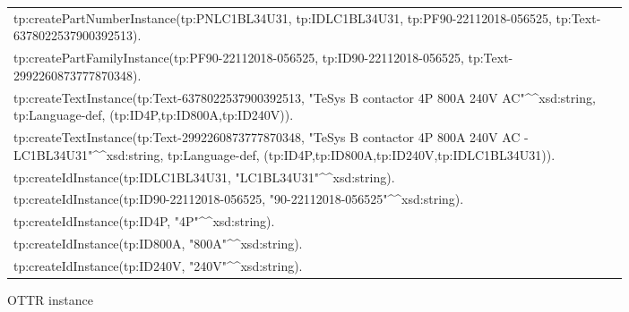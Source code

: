 \begin{figure}[H]
\ContinuedFloat

\begin{subfigure}{\textwidth}
  \centering

  \begin{table}[H]
	  \begin{tabular}{|p{0.98\linewidth}|}
		  \hline
		  tp:createPartNumberInstance(tp:PNLC1BL34U31, tp:IDLC1BL34U31, tp:PF90-22112018-056525, tp:Text-6378022537900392513). \\
		  tp:createPartFamilyInstance(tp:PF90-22112018-056525, tp:ID90-22112018-056525, tp:Text-2992260873777870348). \\
		  tp:createTextInstance(tp:Text-6378022537900392513, "TeSys B contactor 4P 800A 240V AC"\^{}\^{}xsd:string, tp:Language-def, (tp:ID4P,tp:ID800A,tp:ID240V)). \\
		  tp:createTextInstance(tp:Text-2992260873777870348, "TeSys B contactor 4P 800A 240V AC - LC1BL34U31"\^{}\^{}xsd:string, tp:Language-def, (tp:ID4P,tp:ID800A,tp:ID240V,tp:IDLC1BL34U31)). \\
		  tp:createIdInstance(tp:IDLC1BL34U31, "LC1BL34U31"\^{}\^{}xsd:string). \\
		  tp:createIdInstance(tp:ID90-22112018-056525, "90-22112018-056525"\^{}\^{}xsd:string). \\
		  tp:createIdInstance(tp:ID4P, "4P"\^{}\^{}xsd:string). \\
		  tp:createIdInstance(tp:ID800A, "800A"\^{}\^{}xsd:string). \\
		  tp:createIdInstance(tp:ID240V, "240V"\^{}\^{}xsd:string). \\
		  \hline
	  \end{tabular}
  \end{table}

  \caption{OTTR instance}
  \label{fig:ottr_instance_example}
\end{subfigure}
% 

\begin{subfigure}{\textwidth}
  \centering


\end{subfigure}
\end{figure}
